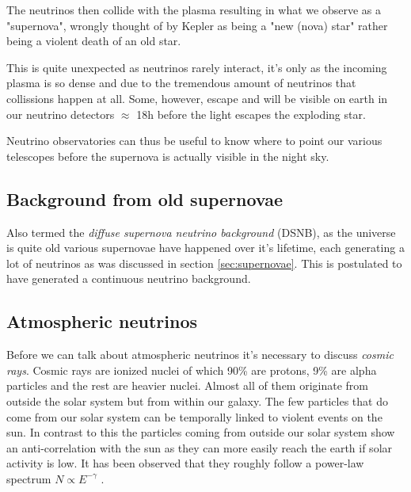 The neutrinos then collide with the plasma resulting in what we observe as a
"supernova", wrongly thought of by Kepler as being a "new (nova) star" rather
being a violent death of an old star.

This is quite unexpected as neutrinos rarely interact, it's only as the
incoming plasma is so dense and due to the tremendous amount of neutrinos that
collissions happen at all. Some, however, escape and will be visible on earth
in our neutrino detectors $\approx$ 18h before the light escapes the exploding
star.

Neutrino observatories can thus be useful to know where to point our various
telescopes before the supernova is actually visible in the night sky.
\subsection{Background from old supernovae}
Also termed the \textit{diffuse supernova neutrino background} (DSNB), as the
universe is quite old various supernovae have happened over it's lifetime, each generating
a lot of neutrinos as was discussed in section \ref{sec:supernovae}. 
This is postulated to have generated a continuous neutrino background\cite{Beacom_2010}.
\subsection{Atmospheric neutrinos}
\label{sec:AtmosphericNeutrinos}
Before we can talk about atmospheric neutrinos it's necessary to discuss \textit{cosmic rays}.
Cosmic rays are ionized nuclei of which 90\% are protons, 9\% are alpha particles and
the rest are heavier nuclei. Almost all of them originate from outside the solar system but
from within our galaxy. The few particles that do come from our solar system can be temporally
linked to violent events on the sun. In contrast to this the particles coming from outside
our solar system show an anti-correlation with the sun as they can more easily reach the earth
if solar activity is low.
It has been observed that they roughly follow a power-law spectrum 
$N \propto E^{-\gamma}$ \cite{gaisser_engel_resconi_2016}.


